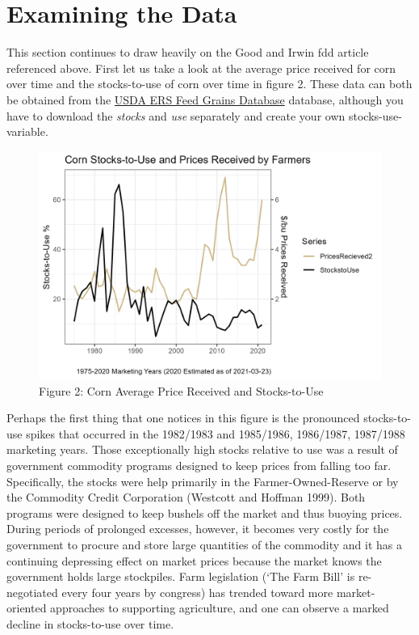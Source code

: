 \documentclass[
  letterpaper,
  DIV=11,
  numbers=noendperiod]{scrreprt}
\begin{document}
\hypertarget{examining-the-data}{%
\section{Examining the Data}\label{examining-the-data}}

This section continues to draw heavily on the Good and Irwin fdd article
referenced above. First let us take a look at the average price received
for corn over time and the stocks-to-use of corn over time in figure 2.
These data can both be obtained from the
\href{http://www.ers.usda.gov/data-products/feed-grains-database.aspx}{USDA
ERS Feed Grains Database} database, although you have to download the
\emph{stocks} and \emph{use} separately and create your own
stocks-use-variable.

\begin{figure}

{\centering \includegraphics{assets/EndingStocksand-StocksUsePrices.png}

}

\caption{Figure 2: Corn Average Price Received and Stocks-to-Use}

\end{figure}

Perhaps the first thing that one notices in this figure is the
pronounced stocks-to-use spikes that occurred in the 1982/1983 and
1985/1986, 1986/1987, 1987/1988 marketing years. Those exceptionally
high stocks relative to use was a result of government commodity
programs designed to keep prices from falling too far. Specifically, the
stocks were help primarily in the Farmer-Owned-Reserve or by the
Commodity Credit Corporation (Westcott and Hoffman 1999). Both programs
were designed to keep bushels off the market and thus buoying prices.
During periods of prolonged excesses, however, it becomes very costly
for the government to procure and store large quantities of the
commodity and it has a continuing depressing effect on market prices
because the market knows the government holds large stockpiles. Farm
legislation (`The Farm Bill' is re-negotiated every four years by
congress) has trended toward more market-oriented approaches to
supporting agriculture, and one can observe a marked decline in
stocks-to-use over time.
\end{document}
